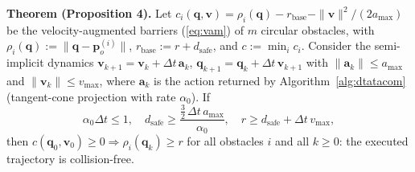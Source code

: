 \documentclass[letterpaper]{article}
\begin{document}
\textbf{Theorem (Proposition 4).} Let $c_i(\boldsymbol{q},\boldsymbol{v}) = \rho_i(\boldsymbol{q}) - r_\text{base} - \|\boldsymbol{v}\|^2/(2a_{\max})$ be the velocity-augmented barriers (\ref{eq:vam}) of $m$ circular obstacles, with $\rho_i(\boldsymbol{q}) := \|\boldsymbol{q} - \boldsymbol{p}_o^{(i)}\|$, $r_\text{base} := r + d_\text{safe}$, and $c := \min_i c_i$. Consider the semi-implicit dynamics $\boldsymbol{v}_{k+1} = \boldsymbol{v}_k + \Delta t\,\boldsymbol{a}_k$, $\boldsymbol{q}_{k+1} = \boldsymbol{q}_k + \Delta t\,\boldsymbol{v}_{k+1}$ with $\|\boldsymbol{a}_k\| \le a_{\max}$ and $\|\boldsymbol{v}_k\| \le v_{\max}$, where $\boldsymbol{a}_k$ is the action returned by Algorithm~\ref{alg:dtatacom} (tangent-cone projection with rate $\alpha_0$). If
\begin{equation}
\alpha_0\Delta t \le 1,
\quad
d_\text{safe} \ge \frac{\tfrac{3}{2}\,\Delta t\,a_{\max}}{\alpha_0},
\quad
r \ge d_\text{safe} + \Delta t\,v_{\max},
\label{eq:prop4}
\end{equation}
then $c(\boldsymbol{q}_0,\boldsymbol{v}_0) \ge 0 \Rightarrow \rho_i(\boldsymbol{q}_k) \ge r$ for all obstacles $i$ and all $k \ge 0$: the executed trajectory is collision-free.
\end{document}
